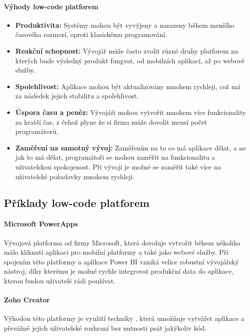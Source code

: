 \paragraph{Výhody low-code platforem}
\begin{itemize}
  \item \textbf{Produktivita:} Systémy mohou být vyvýjeny a nasazeny během menšího časového rozmezí, oproti klasickému programování. \cite{low-code-accelerate}
  \item \textbf{Reakční schopnost:} Vývojář může často zvolit různé druhy platforem na kterých bude výsledný produkt fungvat, od mobilních aplikací, až po webové služby. \cite{low-code-accelerate}
  \item \textbf{Spolehlivost:} Aplikace mohou být aktualizovány mnohem rychleji, což má za následek jejich stabilitu a spolehlivost. \cite{low-code-accelerate}
  \item \textbf{Úspora času a peněz:} Vývojáři mohou vytvořit mnohem více funkcionality za kratší čas, z čehož plyne že si firma může dovolit mensí počet programátorů. \cite{low-code-accelerate}
  \item \textbf{Zaměření na samotný vývoj:} Zaměřením na to co má aplikace dělat, a ne jak to má dělat, programátoři se mohou zaměřit na funkcionalitu a uživatelskou spokojenost. Při vývoji je možné se zaměřit také více na uživatelské požadavky mnohem rychleji. \cite{low-code-accelerate}
\end{itemize}

\subsection{Příklady low-code platforem}
\paragraph{Microsoft PowerApps} Vývojová platforma od firmy Microsoft, která dovoluje vytvořit během několika málo kliknutí aplikaci pro mobilní platformy a také jako webové služby. Při spojením této platformy a aplikace Power BI vzniká velice robustní vývojářský nástroj, díky kterému je možné rychle integrovat produkční data do aplikace, kterou budou uživatelé rádi používat. \cite{pcmag-no-coding}
\paragraph{Zoho Creator} Výhodou této platformy je využití techniky , která umožňuje vytvářet aplikace a převážně jejich uživatelské rozhraní bez nutnosti psát jakýkoliv kód. \cite{zoho-review}
